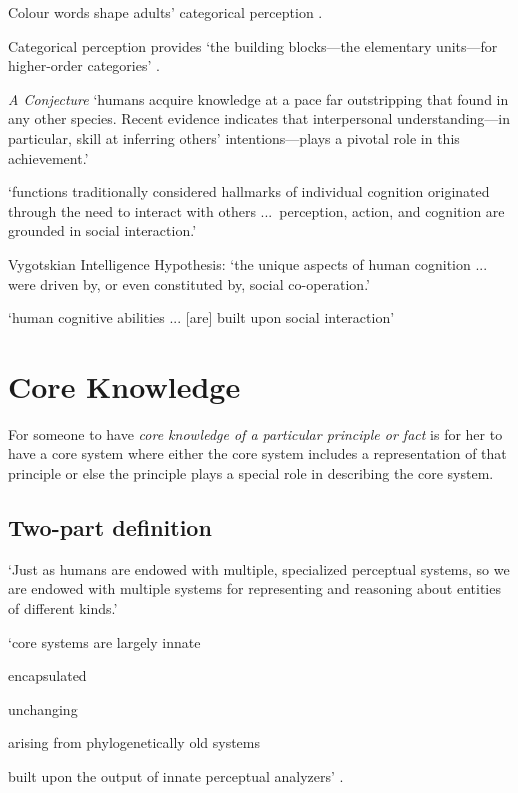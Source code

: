 \documentclass[12pt]{extarticle}
\begin{document}
\begin{multicols}{3}
Colour words shape adults’ categorical perception \citep{Roberson:2007wg,Winawer:2007im}.

Categorical perception provides ‘the building blocks—the elementary units—for higher-order categories’
\citep[p.\ 3]{Harnad:1987ej}.

\emph{A Conjecture}
‘humans acquire knowledge at a pace far outstripping that found in any other species.
Recent evidence indicates that interpersonal understanding—in particular, skill at
inferring others’ intentions—plays a pivotal role in this achievement.’
\citep[p.\ 40]{Baldwin:2000qq}

‘functions traditionally considered hallmarks of individual cognition originated through the need to interact with others ...\ perception, action, and cognition are grounded in social interaction.’
\citep[p.\ 103]{Knoblich:2006bn}

Vygotskian Intelligence Hypothesis:
‘the unique aspects of human cognition ... were driven by, or even constituted by, social co-operation.’
\citep[p.\ 1]{Moll:2007gu}

‘human cognitive abilities ... [are] built upon social interaction’
\citep{sinigaglia:2008_roots} %



\section{Core Knowledge}

For someone to have \textit{core knowledge of a particular principle or fact} is for her to have a core system where
           either the core system includes a representation of that principle or else the principle plays a special role in describing the core system.

\subsection{Two-part definition}

‘Just as humans are endowed with multiple, specialized perceptual systems, so we are endowed with multiple systems for representing and reasoning about entities of different kinds.’
\citep[p.\ 517]{Carey:1996hl}

‘core systems are
largely innate


encapsulated


unchanging


arising from phylogenetically old systems


built upon the output of innate perceptual analyzers’
\citep[p.\ 520]{Carey:1996hl}.


\end{multicols}
\end{document}
